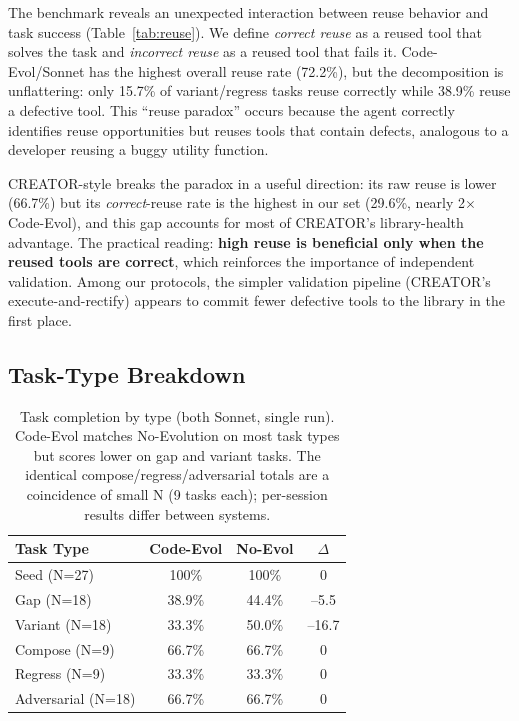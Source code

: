 \documentclass[sigplan,nonacm,natbib=false]{acmart}
\begin{document}
The benchmark reveals an unexpected interaction between reuse behavior and task success (Table~\ref{tab:reuse}). We define \emph{correct reuse} as a reused tool that solves the task and \emph{incorrect reuse} as a reused tool that fails it. Code-Evol/Sonnet has the highest overall reuse rate (72.2\%), but the decomposition is unflattering: only 15.7\% of variant/regress tasks reuse correctly while 38.9\% reuse a defective tool. This ``reuse paradox'' occurs because the agent correctly identifies reuse opportunities but reuses tools that contain defects, analogous to a developer reusing a buggy utility function.

CREATOR-style breaks the paradox in a useful direction: its raw reuse is lower (66.7\%) but its \emph{correct}-reuse rate is the highest in our set (29.6\%, nearly 2$\times$ Code-Evol), and this gap accounts for most of CREATOR's library-health advantage. The practical reading: \textbf{high reuse is beneficial only when the reused tools are correct}, which reinforces the importance of independent validation. Among our protocols, the simpler validation pipeline (CREATOR's execute-and-rectify) appears to commit fewer defective tools to the library in the first place.

\subsection{Task-Type Breakdown}

\begin{table}[t]
\centering
\footnotesize
\begin{tabular}{lccc}
\toprule
\textbf{Task Type} & \textbf{Code-Evol} & \textbf{No-Evol} & $\Delta$ \\
\midrule
Seed (N=27) & 100\% & 100\% & 0 \\
Gap (N=18) & 38.9\% & 44.4\% & --5.5 \\
Variant (N=18) & 33.3\% & 50.0\% & --16.7 \\
Compose (N=9) & 66.7\% & 66.7\% & 0 \\
Regress (N=9) & 33.3\% & 33.3\% & 0 \\
Adversarial (N=18) & 66.7\% & 66.7\% & 0 \\
\bottomrule
\end{tabular}
\caption{Task completion by type (both Sonnet, single run). Code-Evol matches No-Evolution on most task types but scores lower on gap and variant tasks. The identical compose/regress/adversarial totals are a coincidence of small N (9 tasks each); per-session results differ between systems.}
\label{tab:task_type}
\end{table}
\end{document}
